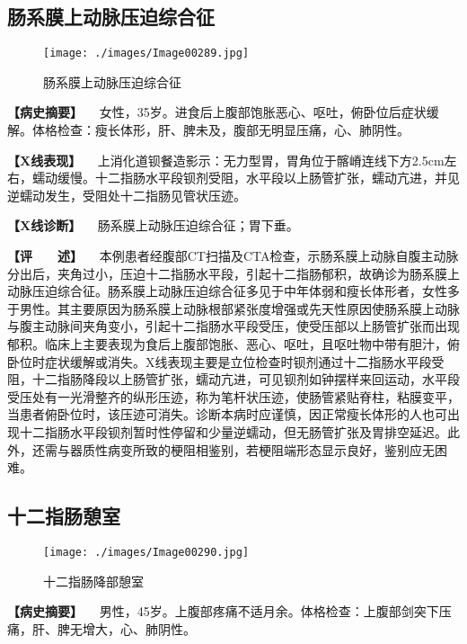\subsection{肠系膜上动脉压迫综合征}

\begin{figure}[!htbp]
 \centering
 \texttt{[image: ./images/Image00289.jpg]}
 \captionsetup{justification=centering}
 \caption{肠系膜上动脉压迫综合征}
 \label{fig5-4-3}
  \end{figure} 

\textbf{【病史摘要】}
　女性，35岁。进食后上腹部饱胀恶心、呕吐，俯卧位后症状缓解。体格检查：瘦长体形，肝、脾未及，腹部无明显压痛，心、肺阴性。

\textbf{【X线表现】}
　上消化道钡餐造影示：无力型胃，胃角位于髂嵴连线下方2.5cm左右，蠕动缓慢。十二指肠水平段钡剂受阻，水平段以上肠管扩张，蠕动亢进，并见逆蠕动发生，受阻处十二指肠见管状压迹。

\textbf{【X线诊断】} 　肠系膜上动脉压迫综合征；胃下垂。

\textbf{【评　　述】}
　本例患者经腹部CT扫描及CTA检查，示肠系膜上动脉自腹主动脉分出后，夹角过小，压迫十二指肠水平段，引起十二指肠郁积，故确诊为肠系膜上动脉压迫综合征。肠系膜上动脉压迫综合征多见于中年体弱和瘦长体形者，女性多于男性。其主要原因为肠系膜上动脉根部紧张度增强或先天性原因使肠系膜上动脉与腹主动脉间夹角变小，引起十二指肠水平段受压，使受压部以上肠管扩张而出现郁积。临床上主要表现为食后上腹部饱胀、恶心、呕吐，且呕吐物中带有胆汁，俯卧位时症状缓解或消失。X线表现主要是立位检查时钡剂通过十二指肠水平段受阻，十二指肠降段以上肠管扩张，蠕动亢进，可见钡剂如钟摆样来回运动，水平段受压处有一光滑整齐的纵形压迹，称为笔杆状压迹，使肠管紧贴脊柱，粘膜变平，当患者俯卧位时，该压迹可消失。诊断本病时应谨慎，因正常瘦长体形的人也可出现十二指肠水平段钡剂暂时性停留和少量逆蠕动，但无肠管扩张及胃排空延迟。此外，还需与器质性病变所致的梗阻相鉴别，若梗阻端形态显示良好，鉴别应无困难。

\subsection{十二指肠憩室}

\begin{figure}[!htbp]
 \centering
 \texttt{[image: ./images/Image00290.jpg]}
 \captionsetup{justification=centering}
 \caption{十二指肠降部憩室}
 \label{fig5-4-4}
  \end{figure} 

\textbf{【病史摘要】}
　男性，45岁。上腹部疼痛不适月余。体格检查：上腹部剑突下压痛，肝、脾无增大，心、肺阴性。

